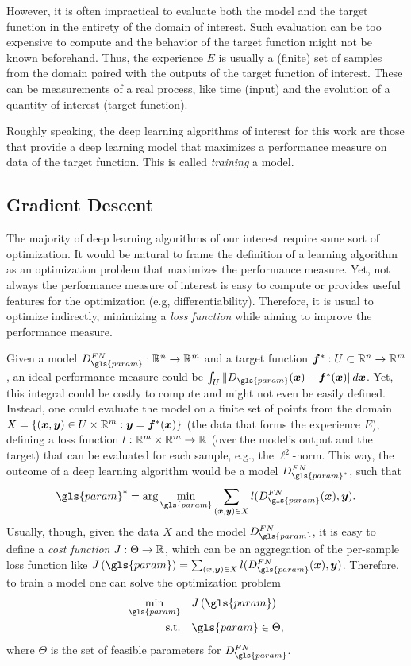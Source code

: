 However, it is often impractical to evaluate both the model and the target function in the entirety of the domain of interest.
Such evaluation can be too expensive to compute and the behavior of the target function might not be known beforehand.
Thus, the experience $E$ is usually a (finite) set of samples from the domain paired with the outputs of the target function of interest.
These can be measurements of a real process, like time (input) and the evolution of a quantity of interest (target function).

Roughly speaking, the deep learning algorithms of interest for this work are those that provide a deep learning model that maximizes a performance measure on data of the target function.
This is called \emph{training} a model.

\subsection{Gradient Descent}

The majority of deep learning algorithms of our interest require some sort of optimization.
It would be natural to frame the definition of a learning algorithm as an optimization problem that maximizes the performance measure.
Yet, not always the performance measure of interest is easy to compute or provides useful features for the optimization (e.g, differentiability).
Therefore, it is usual to optimize indirectly, minimizing a \textit{loss function} while aiming to improve the performance measure.

Given a model $D_{\gls{param}}^{FN}:\R^n\to\R^m$ and a target function $\bm{f}^*:U\subset\mathbb{R}^n\to\mathbb{R}^m$, an ideal performance measure could be $\int_U \|D_{\gls{param}}(\bm{x}) - \bm{f}^*(\bm{x})\|d\bm{x}$.
Yet, this integral could be costly to compute and might not even be easily defined.
Instead, one could evaluate the model on a finite set of points from the domain $X=\{(\bm{x},\bm{y})\in U\times\mathbb{R}^m : \bm{y}=\bm{f}^*(\bm{x})\}$ (the data that forms the experience $E$), defining a loss function $l:\mathbb{R}^m\times\mathbb{R}^m\to\mathbb{R}$ (over the model's output and the target) that can be evaluated for each sample, e.g., the $\ell^2$-norm.
This way, the outcome of a deep learning algorithm would be a model $D_{\gls{param}^*}^{FN}$, such that \[
\gls{param}^* = \arg\min_{\gls{param}} \sum_{(\bm{x},\bm{y})\in X} l(D_{\gls{param}}^{FN}(\bm{x}), \bm{y})
.\] Usually, though, given the data $X$ and the model $D_{\gls{param}}^{FN}$, it is easy to define a \emph{cost function} $J: \Theta\to\mathbb{R}$, which can be an aggregation of the per-sample loss function like $J\left( \gls{param} \right) = \sum_{(\bm{x},\bm{y})\in X} l(D_{\gls{param}}^{FN}(\bm{x}), \bm{y})$.
Therefore, to train a model one can solve the optimization problem
\begin{align*}
    \min_{\gls{param}} \quad & J\left( \gls{param} \right)  \\
    \text{s.t.} \quad & \gls{param} \in \Theta
,\end{align*}
where $\Theta$ is the set of feasible parameters for $D_{\gls{param}}^{FN}$.

